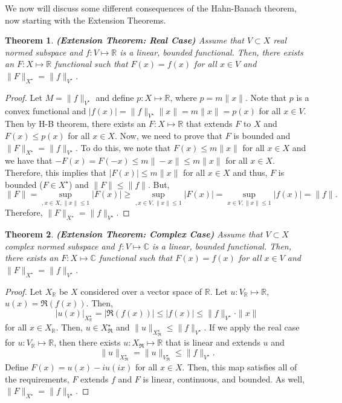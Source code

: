 \documentclass[12pt]{article}
\newtheorem{theorem}{Theorem}
\newcommand{\R}{{\mathbb R}}
\newcommand{\C}{{\mathbb C}}
\newcommand{\sbs}{\subset}
\newcommand{\Xs}{X^{\star}}
\newcommand{\Vs}{V^{\star}}
\begin{document}
\setcounter{cons}{0}
\vspace{-25pt}
We now will discuss some different consequences of the Hahn-Banach theorem, now starting with the Extension Theorems.
\begin{theorem} \textbf{(Extension Theorem: Real Case)}
Assume that $V \sbs X$ real normed subspace and $f: V\mapsto \R$ is a linear, bounded functional. Then, there exists an $F: X \mapsto \R$ functional such that $F(x) = f(x)$ for all $x \in V$ and $\| F \|_{\Xs} = \| f \|_{V^{\star}}$.
\end{theorem}
\vspace{-25pt}
\begin{proof}
Let $M = \| f \|_{V^{\star}}$ and define $p: X \mapsto \R$, where $p = m\| x \|$. Note that $p$ is a convex functional and $|f(x)| = \| f \|_{\Vs} \| x \| = m \| x \| = p(x)$ for all $x \in V$. Then by H-B theorem, there exists an $F: X \mapsto \R$ that extends $F$ to $X$ and $F(x) \leq p(x)$ for all $x \in X$. Now, we need to prove that $F$ is bounded and $\| F \|_{\Xs} = \| f \|_{\Vs}$. To do this, we note that $F(x) \leq m \| x \|$ for all $ x \in X$ and we have that $-F(x) = F(-x) \leq m \| -x \|\leq m \| x \|$ for all $x \in X$. Therefore, this implies that $|F(x)| \leq m \| x \|$ for all $x \in X$ and thus, $F$ is bounded ($F \in \Xs$) and $\| F \| \leq \|f \|$. But, 
\[ \| F \| = \sup\limits_{, x \in X, \| x \| \leq 1} |F(x)| \geq \sup\limits_{, x \in V, \| x \| \leq 1} |F(x)| = \sup\limits_{ x \in V, \| x \| \leq 1} |f(x)|  = \| f \|.\]
Therefore, $\| F \|_{\Xs} = \| f \|_{\Vs}$. 
\end{proof}
\begin{theorem} \textbf{(Extension Theorem: Complex Case)}
Assume that $V \sbs X$ complex normed subspace and $f: V\mapsto \C$ is a linear, bounded functional. Then, there exists an $F: X \mapsto \C$ functional such that $F(x) = f(x)$ for all $x \in V$ and $\| F \|_{\Xs} = \| f \|_{V^{\star}}$.
\end{theorem}
\vspace{-25pt}
\begin{proof}
Let $X_{\R}$ be $X$ considered over a vector space of $\R$. Let $u: V_{\R} \mapsto \R$, $u(x) = \Re(f(x))$. Then, 
\[ |u(x)|_{X_{\R}^{\star}} = |\Re(f(x))| \leq |f(x)| \leq \| f \|_{\Vs} \cdot \| x \|\]
for all $x \in X_{\R}$. Then, $u \in X_{\Re}^{\star}$ and $\| u \|_{X_{\Re}^{\star}} \leq \| f \|_{\Vs}$. If we apply the real case for $u: V_{\R} \mapsto \R$, then there exists $u: X_{\Re} \mapsto \R$ that is linear and extends $u$ and 
\[ \| u \|_{X_{\Re}^{\star}} = \| u \|_{V_{\Re}^{\star}} \leq \| f \|_{\Vs}.\]
Define $F(x) = u(x) - i u(ix)$ for all $x \in X$. Then, this map satisfies all of the requirements, $F$ extends $f$ and $F$ is linear, continuous, and bounded. As well, $\| F \|_{\Xs} = \| f \|_{\Vs}$.
\end{proof}
\end{document}
